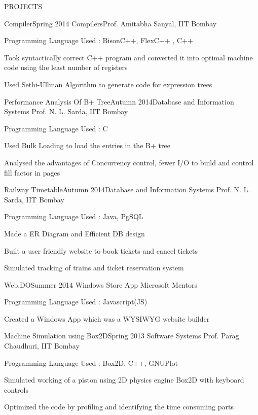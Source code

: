 \documentclass{resume} %
\begin{document}
\begin{rSection}{PROJECTS}
\begin{rSubsection}{Compiler}{Spring 2014}{ Compilers}{Prof. Amitabha Sanyal, IIT Bombay}
\item Programming Language Used : BisonC++,  FlexC++ , C++
\item Took syntactically correct C++ program and converted it into optimal machine code using the least number of registers
\item Used Sethi-Ullman Algorithm to generate code for expression trees
\end{rSubsection}

\begin{rSubsection}{Performance Analysis Of B+ Tree}{Autumn 2014}{Database and Information Systems }{ Prof. N. L. Sarda, IIT Bombay}
\item Programming Language Used : C
\item Used Bulk Loading to load the entries in the B+ tree
\item Analysed the advantages of Concurrency control, fewer I/O to build and control fill factor in pages
\end{rSubsection}

\begin{rSubsection}{Railway Timetable}{Autumn 2014}{Database and Information Systems }{ Prof. N. L. Sarda, IIT Bombay}
\item Programming Language Used : Java, PgSQL
\item Made a ER Diagram and Efficient DB design
\item Built a user friendly website to book tickets and cancel tickets
\item Simulated tracking of trains and ticket reservation system
\end{rSubsection}


\begin{rSubsection}{Web.DO}{Summer 2014}{ Windows Store App }{Microsoft Mentors}
\item Programming Language Used : Javascript(JS)
\item Created a Windows App which was a WYSIWYG website builder
\end{rSubsection}


\begin{rSubsection}{Machine Simulation using Box2D}{Spring 2013}{ Software Systems }{ Prof. Parag Chaudhuri, IIT Bombay}
\item Programming Language Used : Box2D, C++, GNUPlot
\item Simulated working of a piston using 2D physics engine Box2D with keyboard controls 
\item Optimized the code by profiling and identifying the time consuming parts


\end{rSubsection}
\end{rSection}
\end{document}
